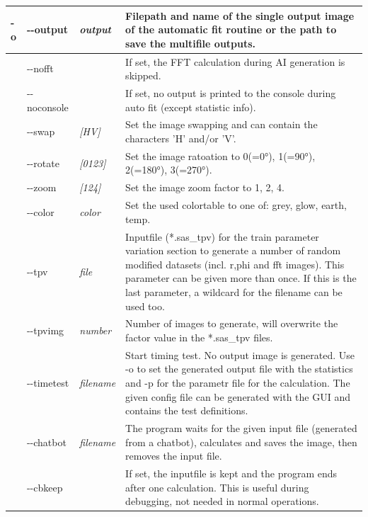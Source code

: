 \documentclass[11pt]{article} %
\begin{document}
\begin{longtable}{|L{1cm}|L{2cm}|C{2cm}|L{12cm}|}
-o & -{}-output & {\it output} & Filepath and name of the single output image of the automatic fit routine or the path to save the  multifile outputs. \\ \hline
 & -{}-nofft & & If set, the FFT calculation during AI generation is skipped. \\ \hline
 & -{}-noconsole & & If set, no output is printed to the console during auto fit (except statistic info). \\ \hline
 & -{}-swap & {\it [HV]} & Set the image swapping and can contain the characters 'H' and/or 'V'. \\ \hline
 & -{}-rotate & {\it [0123]} & Set the image ratoation to 0(=0°), 1(=90°), 2(=180°), 3(=270°). \\ \hline
 & -{}-zoom & {\it [124]} & Set the image zoom factor to 1, 2, 4. \\ \hline
 & -{}-color & {\it color} & Set the used colortable to one of: grey, glow, earth, temp. \\ \hline
 & -{}-tpv & {\it file} & Inputfile (*.sas\_tpv) for the train parameter variation section to generate a number of random modified datasets (incl. r,phi and fft images). This parameter can be given more than once. If this is the last parameter, a wildcard for the filename can be used too. \\ \hline
 & -{}-tpvimg & {\it number} & Number of images to generate, will overwrite the factor value in the *.sas\_tpv files. \\ \hline
 & -{}-timetest & {\it filename} & Start timing test. No output image is generated. Use -o to set the generated output file with the statistics and -p for the parametr file for the calculation. The given config file can be generated with the GUI and contains the test definitions. \\ \hline
 & -{}-chatbot & {\it filename} & The program waits for the given input file (generated from a chatbot), calculates and saves the image, then removes the input file. \\ \hline
 & -{}-cbkeep & & If set, the inputfile is kept and the program ends after one calculation. This is useful during debugging, not needed in normal operations. \\ \hline
\end{longtable}
\end{document}
